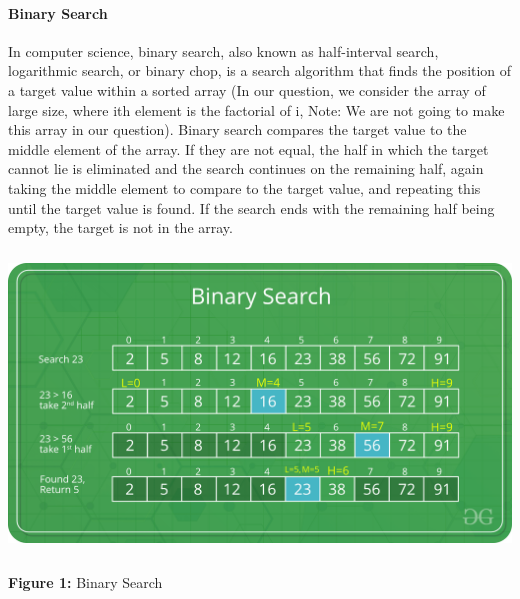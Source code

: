 \documentclass[10pt]{article}
\begin{document}
\begin{multicols*}{2}
\paragraph{Binary Search}
In computer science, binary search, also known as half-interval search, logarithmic search, or binary chop, is a search algorithm that finds the position of a target value within a sorted array (In our question, we consider the array of large size, where ith element is the factorial of i, Note: We are not going to make this array in our question). Binary search compares the target value to the middle element of the array. If they are not equal, the half in which the target cannot lie is eliminated and the search continues on the remaining half, again taking the middle element to compare to the target value, and repeating this until the target value is found. If the search ends with the remaining half being empty, the target is not in the array.


\includegraphics[width=\columnwidth, height=8cm]{Binary-Search.png}\begin{center}\textbf{Figure 1:} Binary Search\end{center}



\end{multicols*}
\end{document}
